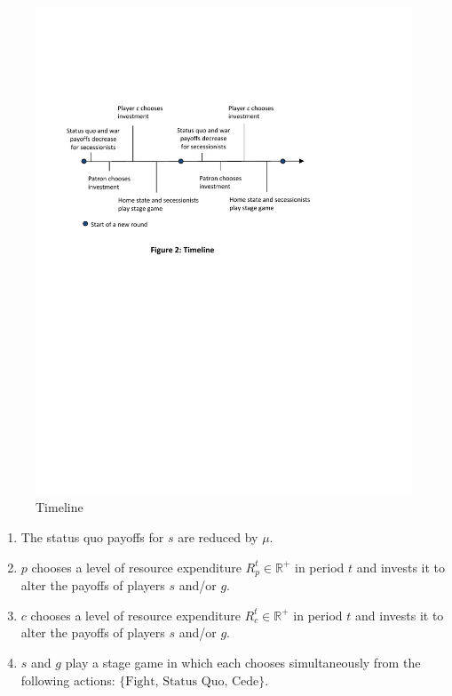 \documentclass[11pt,letterpaper, notitlepage]{article}
\begin{document}
\begin{figure}
\includegraphics{Timeline2.pdf}
\caption{Timeline}
\end{figure}

\begin{enumerate} 
\item The status quo payoffs for $s$ are reduced by $\mu$.

\item $p$ chooses a level of resource expenditure $R_p^t\in \mathbb{R}^+$ in period $t$ and invests it to alter the payoffs of players $s$ and/or $g$. 
 
\item $c$ chooses a level of resource expenditure $R_c^t\in \mathbb{R}^+$ in period $t$ and invests it to alter the payoffs of players $s$ and/or $g$. 
 
\item $s$ and $g$ play a stage game in which each chooses simultaneously from the following actions: $\{\text{Fight, Status Quo, Cede}\}$. 
\end{enumerate}
\end{document}
